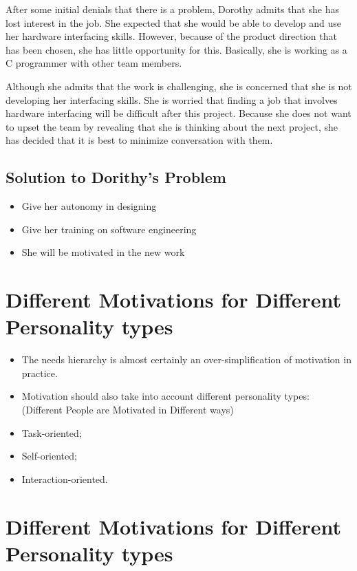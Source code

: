 After some initial denials that there is a problem, Dorothy admits that she has lost interest in the job. She expected that she would be able to develop and use her hardware interfacing skills. However, because of the product direction that has been chosen, she has little opportunity for this. Basically, she is working as a C programmer with other team members.


Although she admits that the work is challenging, she is concerned that she is not developing her interfacing skills. She is worried that finding a job that involves hardware interfacing will be difficult after this project. Because she does not want to upset the team by revealing that she is thinking about the next project, she has decided that it is best to minimize conversation with them.

\subsection{Solution to Dorithy’s Problem}
\begin{itemize}
\item Give her autonomy in designing

\item Give her training on software engineering

\item She will be motivated in the new work


\end{itemize} \section{ Different Motivations for Different Personality types}
\begin{itemize}

\item The needs hierarchy is almost certainly an over-simplification of motivation in practice.

\item Motivation should also take into account different personality types: (Different People are Motivated in Different ways)

  \item Task-oriented;   \item Self-oriented;   \item Interaction-oriented.


\end{itemize} \section{ Different Motivations for Different Personality types}
